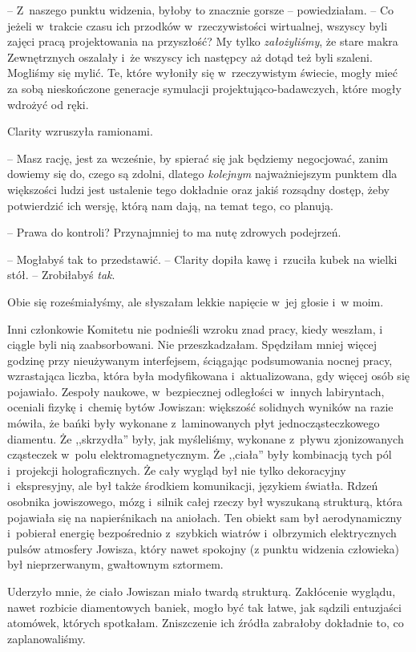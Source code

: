 \documentclass[oneside,polish,11pt,sfheadings]{mwbk}
\begin{document}
-- Z~naszego punktu widzenia, byłoby to znacznie gorsze -- powiedziałam. -- Co jeżeli w~trakcie czasu ich przodków w~rzeczywistości wirtualnej,
wszyscy byli zajęci pracą projektowania na przyszłość? My tylko
\textit{założyliśmy}, że stare makra Zewnętrznych oszalały i~że wszyscy
ich następcy aż dotąd też byli szaleni. Mogliśmy się mylić. Te, które
wyłoniły się w~rzeczywistym świecie, mogły mieć za sobą nieskończone
generacje symulacji projektująco-badawczych, które mogły wdrożyć od
ręki.

Clarity wzruszyła ramionami. 

-- Masz rację, jest za wcześnie, by spierać
się jak będziemy negocjować, zanim dowiemy się do, czego są zdolni,
dlatego \textit{kolejnym} najważniejszym punktem dla większości ludzi jest
ustalenie tego dokładnie oraz jakiś rozsądny dostęp, żeby potwierdzić
ich wersję, którą nam dają, na temat tego, co planują.

-- Prawa do kontroli? Przynajmniej to ma nutę zdrowych podejrzeń.

-- Mogłabyś tak to przedstawić. -- Clarity dopiła kawę i~rzuciła kubek na
wielki stół. -- Zrobiłabyś \textit{tak}.

Obie się roześmiałyśmy, ale słyszałam lekkie napięcie w~jej głosie i~w moim.

Inni członkowie Komitetu nie podnieśli wzroku znad pracy, kiedy weszłam,
i ciągle byli nią zaabsorbowani. Nie przeszkadzałam. Spędziłam mniej
więcej godzinę przy nieużywanym interfejsem, ściągając podsumowania
nocnej pracy, wzrastająca liczba, która była modyfikowana i~aktualizowana, gdy więcej osób się pojawiało. Zespoły naukowe, w~bezpiecznej odległości w~innych labiryntach, oceniali fizykę i~chemię
bytów Jowiszan: większość solidnych wyników na razie mówiła, że bańki
były wykonane z~laminowanych płyt jednocząsteczkowego diamentu. Że
,,skrzydła'' były, jak myśleliśmy, wykonane z~pływu zjonizowanych
cząsteczek w~polu elektromagnetycznym. Że ,,ciała'' były kombinacją tych
pól i~projekcji holograficznych. Że cały wygląd był nie tylko
dekoracyjny i~ekspresyjny, ale był także środkiem komunikacji, językiem
światła. Rdzeń osobnika jowiszowego, mózg i~silnik całej rzeczy był
wyszukaną strukturą, która pojawiała się na napierśnikach na aniołach.
Ten obiekt sam był aerodynamiczny i~pobierał energię bezpośrednio z~szybkich wiatrów i~olbrzymich elektrycznych pulsów atmosfery Jowisza,
który nawet spokojny (z punktu widzenia człowieka) był nieprzerwanym,
gwałtownym sztormem.

Uderzyło mnie, że ciało Jowiszan miało twardą strukturą. Zakłócenie
wyglądu, nawet rozbicie diamentowych baniek, mogło być tak łatwe, jak
sądzili entuzjaści atomówek, których spotkałam. Zniszczenie ich źródła
zabrałoby dokładnie to, co zaplanowaliśmy.
\end{document}
